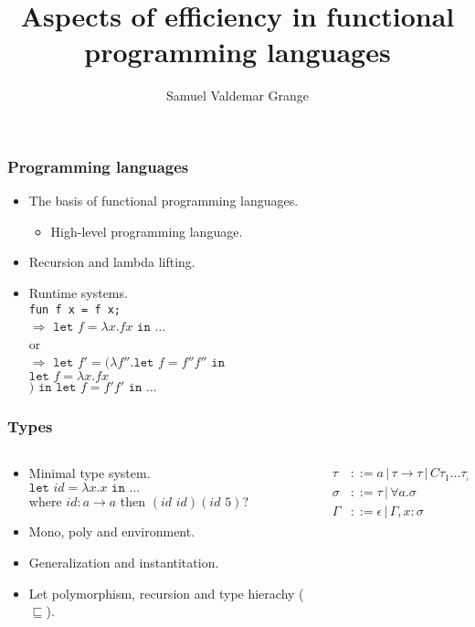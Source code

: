 \documentclass{beamer}
\title{Aspects of efficiency in functional programming languages}
\author{Samuel Valdemar Grange}
\institute{Department of Mathematics and Computer Science (IMADA)}
\date{}
\begin{document}
\frame{\titlepage}

\begin{frame}
\frametitle{Programming languages}
\begin{itemize}
    \item The basis of functional programming languages.
    \begin{itemize}
        \item High-level programming language.
    \end{itemize}
    \item Recursion and lambda lifting.
    \item Runtime systems.\\
    \texttt{fun f x = f x;}\\
    $\Rightarrow$ $\texttt{let } f = \lambda x.f x \texttt{ in } \dots$
    \\or\\
    $\Rightarrow$ $\texttt{let } f' = (\lambda f''. \texttt{let } f = f'' f'' \texttt{ in }$\\
    \hspace*{1cm}$\texttt{let } f = \lambda x.f x$\\
    $) \texttt{ in } \texttt{let } f = f' f' \texttt{ in } \dots$
\end{itemize}
\end{frame}

\begin{frame}
\frametitle{Types}
\begin{columns}
    \begin{column}{0.6\textwidth}
        \begin{itemize}
            \item Minimal type system.\\
            $\texttt{let } id = \lambda x.x \texttt{ in } \dots$\\
            where $id: a \rightarrow a$ then $(id \,\, id) (id \,\, 5)$?
            \item Mono, poly and environment.
            \item Generalization and instantitation.
            \item Let polymorphism, recursion and type hierachy ($\sqsubseteq$).
        \end{itemize}
    \end{column}
    
    \begin{column}{0.4\textwidth}
        \begin{align}
        \tau &::= a \,|\, \tau \rightarrow \tau \,|\, C\tau_1 \dots \tau_n \tag*{}\\
        \sigma &::= \tau \,|\, \forall a.\sigma \tag*{}\\
        \Gamma &::= \epsilon \,|\, \Gamma, x: \sigma \tag*{}
        \end{align}
    \end{column}
\end{columns}
\end{frame}
\end{document}
